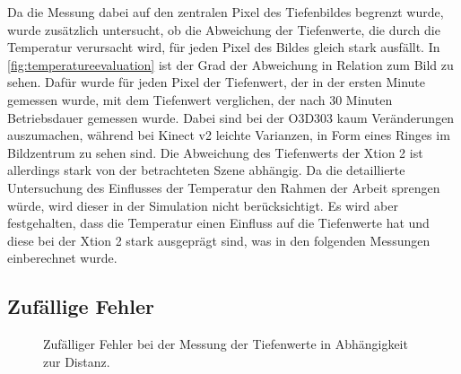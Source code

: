 \documentclass[thesis.tex]{subfiles}
\begin{document}
Da die Messung dabei auf den zentralen Pixel des Tiefenbildes begrenzt wurde, wurde zusätzlich untersucht, ob die Abweichung der Tiefenwerte, die durch die Temperatur verursacht wird, für jeden Pixel des Bildes gleich stark ausfällt. In \autoref{fig:temperatureevaluation} ist der Grad der Abweichung in Relation zum Bild zu sehen. Dafür wurde für jeden Pixel der Tiefenwert, der in der ersten Minute gemessen wurde, mit dem Tiefenwert verglichen, der nach 30 Minuten Betriebsdauer gemessen wurde. Dabei sind bei der O3D303 kaum Veränderungen auszumachen, während bei Kinect v2 leichte Varianzen, in Form eines Ringes im Bildzentrum zu sehen sind. Die Abweichung des Tiefenwerts der Xtion 2 ist allerdings stark von der betrachteten Szene abhängig. Da die detaillierte Untersuchung des Einflusses der Temperatur den Rahmen der Arbeit sprengen würde, wird dieser in der Simulation nicht berücksichtigt. Es wird aber festgehalten, dass die Temperatur einen Einfluss auf die Tiefenwerte hat und diese bei der Xtion 2 stark ausgeprägt sind, was in den folgenden Messungen einberechnet wurde.
%
\subsection{Zufällige Fehler}\label{sec:noise_error}
%
\begin{figure}[h!]
\centering
{}
\caption{Zufälliger Fehler bei der Messung der Tiefenwerte in Abhängigkeit zur Distanz.}
\label{fig:noise_distance_ratio}
\end{figure}
\end{document}
